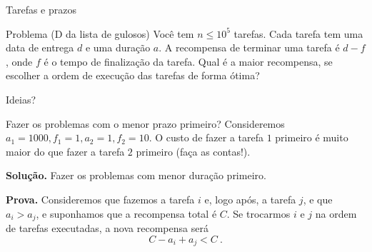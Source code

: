 \begin{frame}{Tarefas e prazos}

    \begin{block}{Problema (D da lista de gulosos)}
        Você tem $n \leq 10^5$ tarefas. Cada tarefa tem uma data de entrega $d$ e uma duração $a$. A recompensa de terminar uma tarefa é $d - f$, onde $f$ é o tempo de finalização da tarefa. Qual é a maior recompensa, se escolher a ordem de execução das tarefas de forma ótima?
    \end{block} \pause

    Ideias? \pause

    Fazer os problemas com o menor prazo primeiro? Consideremos $a_1 = 1000, f_1 = 1, a_2 = 1, f_2 = 10$. O custo de fazer a tarefa $1$ primeiro é muito maior do que fazer a tarefa $2$ primeiro (faça as contas!). \pause

    {\bf Solução.} Fazer os problemas com menor duração primeiro. \pause

    {\bf Prova.} Consideremos que fazemos a tarefa $i$ e, logo após, a tarefa $j$, e que $a_i > a_j$, e suponhamos que a recompensa total é $C$. Se trocarmos $i$ e $j$ na ordem de tarefas executadas, a nova recompensa será \pause
        \[ C - a_i + a_j < C \ . \]

\end{frame}

